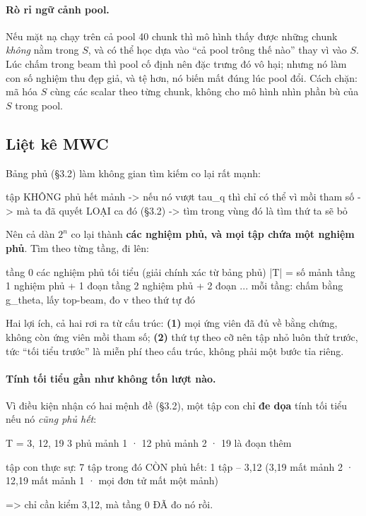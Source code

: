 \documentclass[11pt,a4paper]{article}
\begin{document}
\paragraph{Rò rỉ ngữ cảnh pool.} Nếu mặt nạ chạy trên cả pool 40 chunk thì mô hình thấy được
những chunk \emph{không} nằm trong $S$, và có thể học dựa vào ``cả pool trông thế nào'' thay
vì vào $S$. Lúc chấm trong beam thì pool cố định nên đặc trưng đó vô hại; nhưng nó làm con số
nghiệm thu đẹp giả, và tệ hơn, nó biến mất đúng lúc pool đổi. Cách chặn: mã hóa $S$ cùng các
scalar theo từng chunk, không cho mô hình nhìn phần bù của $S$ trong pool.

\subsection{Liệt kê MWC}

Bảng phủ (\S3.2) làm không gian tìm kiếm co lại rất mạnh:

\begin{dia}
tập KHÔNG phủ hết mảnh  ->  nếu nó vượt tau_q thì chỉ có thể vì mồi tham số
                        ->  mà ta đã quyết LOẠI ca đó (§3.2)
                        ->  tìm trong vùng đó là tìm thứ ta sẽ bỏ
\end{dia}

Nên cả dàn $2^n$ co lại thành \textbf{các nghiệm phủ, và mọi tập chứa một nghiệm phủ}. Tìm
theo từng tầng, đi lên:

\begin{dia}
tầng 0   các nghiệm phủ tối tiểu (giải chính xác từ bảng phủ)   |T| = số mảnh
tầng 1   nghiệm phủ + 1 đoạn
tầng 2   nghiệm phủ + 2 đoạn
...
mỗi tầng:  chấm bằng g_theta, lấy top-beam, đo v theo thứ tự đó
\end{dia}

Hai lợi ích, cả hai rơi ra từ cấu trúc: \textbf{(1)} mọi ứng viên đã đủ về bằng chứng, không
còn ứng viên mồi tham số; \textbf{(2)} thứ tự theo cỡ nên tập nhỏ luôn thử trước, tức
``tối tiểu trước'' là miễn phí theo cấu trúc, không phải một bước tỉa riêng.

\paragraph{Tính tối tiểu gần như không tốn lượt nào.} Vì điều kiện nhận có hai mệnh đề
(\S3.2), một tập con chỉ \textbf{đe dọa} tính tối tiểu nếu nó \emph{cũng phủ hết}:

\begin{dia}
T = {3, 12, 19}      3 phủ mảnh 1 · 12 phủ mảnh 2 · 19 là đoạn thêm

tập con thực sự:           7 tập
trong đó CÒN phủ hết:      1 tập  --  {3,12}
     ({3,19} mất mảnh 2 · {12,19} mất mảnh 1 · mọi đơn tử mất một mảnh)

=>  chỉ cần kiểm {3,12},  mà tầng 0 ĐÃ đo nó rồi.
\end{dia}
\end{document}
